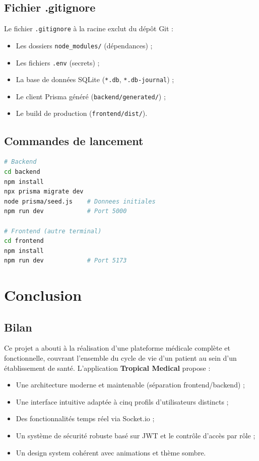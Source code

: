 \documentclass[12pt, a4paper]{report}
\begin{document}
\section{Fichier .gitignore}

Le fichier \texttt{.gitignore} à la racine exclut du dépôt Git :
\begin{itemize}
  \item Les dossiers \texttt{node\_modules/} (dépendances) ;
  \item Les fichiers \texttt{.env} (secrets) ;
  \item La base de données SQLite (\texttt{*.db}, \texttt{*.db-journal}) ;
  \item Le client Prisma généré (\texttt{backend/generated/}) ;
  \item Le build de production (\texttt{frontend/dist/}).
\end{itemize}

\section{Commandes de lancement}

\begin{lstlisting}[language=bash, caption={Démarrage du projet en développement}]
# Backend
cd backend
npm install
npx prisma migrate dev
node prisma/seed.js    # Donnees initiales
npm run dev            # Port 5000

# Frontend (autre terminal)
cd frontend
npm install
npm run dev            # Port 5173
\end{lstlisting}

\chapter{Conclusion}

\section{Bilan}

Ce projet a abouti à la réalisation d'une plateforme médicale complète et
fonctionnelle, couvrant l'ensemble du cycle de vie d'un patient au sein d'un
établissement de santé. L'application \textbf{Tropical Medical} propose :

\begin{itemize}
  \item Une architecture moderne et maintenable (séparation frontend/backend) ;
  \item Une interface intuitive adaptée à cinq profils d'utilisateurs distincts ;
  \item Des fonctionnalités temps réel via Socket.io ;
  \item Un système de sécurité robuste basé sur JWT et le contrôle d'accès
        par rôle ;
  \item Un design system cohérent avec animations et thème sombre.
\end{itemize}
\end{document}
